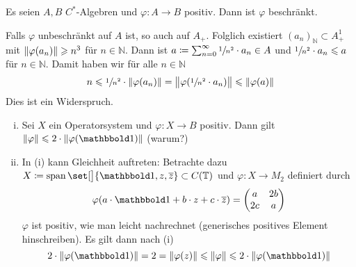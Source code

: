 \begin{proposition}[label=prop:36,{name=[positive Abbildungen sind beschränkt]}]
	Es seien $A,B$ $C^*$-Algebren und $\varphi \colon A \to B$ positiv.
	Dann ist $\varphi$ beschränkt.
\end{proposition}
\begin{beweis}
	Falls $\varphi$ unbeschränkt auf $A$ ist, so auch auf $A_+$.
	Folglich existiert $(a_n)_{\mathbb{N}} \subset A_+^1$ mit $\norm*{\varphi(a_n)} \ge n^3$ für $n \in \mathbb{N}$.
	Dann ist $a \coloneqq \sum_{n=0}^{\infty} \sfrac{1}{n^2} \cdot a_n \in A$ und $\sfrac{1}{n^2} \cdot a_n \le a$ für $n \in \mathbb{N}$.
	Damit haben wir für alle $n \in \mathbb{N}$
	\[
		n \le \sfrac{1}{n^2} \cdot \norm*{\varphi(a_n)} = \norm[\big]{\varphi \enbrace*{\sfrac{1}{n^2} \cdot a_n}} \le \norm*{\varphi(a)} 
	\]
	Dies ist ein Widerspruch.
\end{beweis}

\begin{bemerkung}[label=bem:37,{name=[{positive Abbildungen auf Operatorsystemen}]}]
	\leavevmode
	\begin{enumerate}[(i),itemsep=1pt]
		\item Sei $X$ ein Operatorsystem und $\varphi \colon X \to B$ positiv.
		Dann gilt $\norm*{\varphi} \le 2 \cdot \norm*{\varphi(\ind)}$ (warum?)
		\item In (i) kann Gleichheit auftreten: 
		Betrachte dazu $X \coloneqq \Span \set[\big]{\ind,z,\overline{z}} \subset C(\mathbb{T})$ und $\varphi \colon X \to M_2$ definiert durch
		\[
			\varphi \enbrace*{a \cdot \ind + b \cdot z + c \cdot \overline{z}} = \begin{pmatrix}
				a & 2 b \\
				2 c & a
			\end{pmatrix}
		\]
		$\varphi$ ist positiv, wie man leicht nachrechnet (generisches positives Element hinschreiben).
		Es gilt dann nach (i) 
		\[
			2 \cdot \norm*{\varphi(\ind)} = 2 = \norm*{\varphi(z)} \le \norm*{\varphi} \le 2 \cdot \norm*{\varphi(\ind)}
		\]
	\end{enumerate}
\end{bemerkung}

